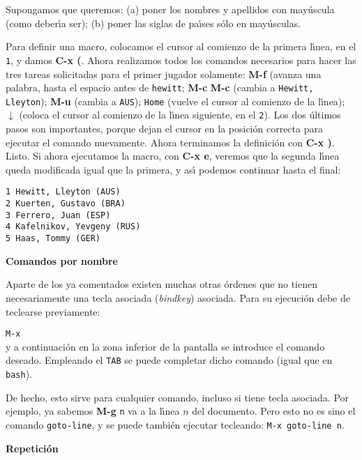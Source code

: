 Supongamos que queremos: (a) poner los nombres y apellidos con
may\'uscula (como deber\'{\i}a ser); 
(b) poner las siglas de pa\'{\i}ses s\'olo en
may\'usculas. 

Para definir una macro, 
colocamos el cursor al comienzo de la primera l\'{\i}nea, en el {\tt
  1}, y damos {\bf C-x (}. Ahora realizamos todos los comandos
necesarios para hacer las tres tareas solicitadas para el primer
jugador solamente: {\bf M-f} (avanza una palabra, hasta el espacio
antes de {\tt hewitt}; {\bf M-c} {\bf M-c} (cambia a {\tt Hewitt,
  Lleyton}); {\bf M-u} (cambia a {\tt AUS}); {\tt Home} (vuelve el
cursor al comienzo de la l\'{\i}nea);  $\downarrow$ (coloca el cursor
al comienzo de la l\'{\i}nea siguiente, en el {\tt 2}). Los dos
\'ultimos pasos son importantes, porque dejan el cursor en la
posici\'on correcta para ejecutar el comando nuevamente. Ahora
terminamos la definici\'on con {\bf C-x )}. Listo. Si ahora ejecutamos
la macro, con {\bf C-x e}, veremos que la segunda l\'{\i}nea queda
modificada igual que la primera, y as\'{\i} podemos continuar hasta el
final:

\begin{verbatim}
1 Hewitt, Lleyton (AUS)
2 Kuerten, Gustavo (BRA)
3 Ferrero, Juan (ESP)
4 Kafelnikov, Yevgeny (RUS)
5 Haas, Tommy (GER)
\end{verbatim}


\vspace{0.2cm}

\noindent
{\bf Comandos por nombre}
\vspace{0.2cm}

Aparte de los ya comentados existen muchas otras {\'o}rdenes que no tienen
necesariamente una tecla asociada ({\it bindkey}) asociada. Para su
ejecuci{\'o}n debe de teclearse previamente:

\verb+M-x+\\
\noindent
y a continuaci{\'o}n en la zona inferior de la pantalla se introduce el
comando deseado. Empleando el \verb+TAB+ se puede completar dicho
comando (igual que en \verb+bash+).

De hecho, esto sirve para cualquier comando, incluso si tiene tecla
asociada. Por ejemplo, ya sabemos {\bf M-g} {\tt n} va a la l\'{\i}nea $n$
del documento. Pero esto no es sino el comando {\tt goto-line}, y se
puede tambi\'en ejecutar tecleando: \verb+M-x goto-line n+.


\vspace{0.2cm}

\noindent
{\bf Repetici{\'o}n} 
\vspace{0.2cm}
 
